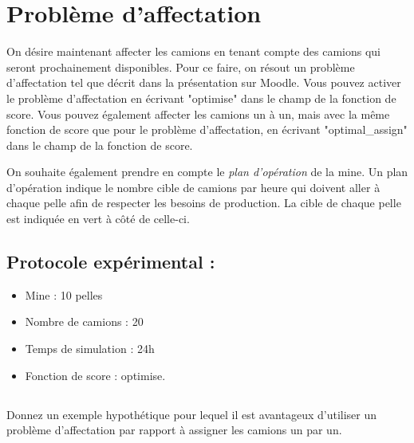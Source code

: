 \documentclass[letterpaper,12pt]{article}
\begin{document}
	
	
	\section{Problème d'affectation}
	
	On désire maintenant affecter les camions en tenant compte des camions qui seront prochainement disponibles. Pour ce faire, on résout un problème d'affectation tel que décrit dans la présentation sur Moodle. Vous pouvez activer le problème d'affectation en écrivant "optimise" dans le champ de la fonction de score. Vous pouvez également affecter les camions un à un, mais avec la même fonction de score que pour le problème d'affectation, en écrivant "optimal\_assign" dans le champ de la fonction de score.
	
	On souhaite également prendre en compte le \textit{plan d'opération} de la mine. Un plan d'opération indique le nombre cible de camions par heure qui doivent aller à chaque pelle afin de respecter les besoins de production. La cible de chaque pelle est indiquée en vert à côté de celle-ci.
	
	
	\subsection*{Protocole expérimental : }
	
	\begin{itemize}
		\item Mine : 10 pelles
		\item Nombre de camions : 20
		\item Temps de simulation : 24h
		\item Fonction de score : optimise.
	\end{itemize}
	
	
	
	\subsection{}
	
	Donnez un exemple hypothétique pour lequel il est avantageux d'utiliser un problème d'affectation par rapport à assigner les camions un par un.
	
	\subsubsection{} 
	
\end{document}
